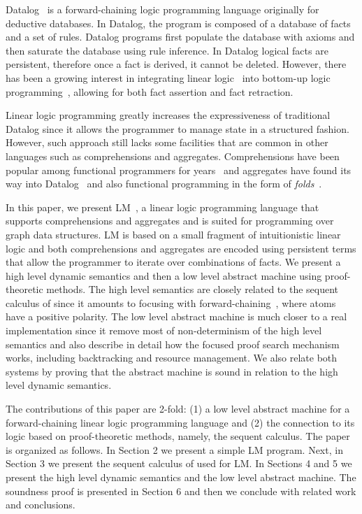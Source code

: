 
Datalog~\cite{Ramakrishnan93asurvey} is a forward-chaining logic programming
language originally for deductive databases. In Datalog, the program is composed
of a database of facts and a set of rules. Datalog programs first populate the
database with axioms and then saturate the database using rule inference. In
Datalog logical facts are persistent, therefore once a fact is derived, it
cannot be deleted. However, there has been a growing interest in integrating
linear logic~\cite{girard-87} into bottom-up logic
programming~\cite{Chang03ajudgmental,cruz-iclp14,Lopez:2005:MCL:1069774.1069778,simmons-lla},
allowing for both fact assertion and fact retraction.

Linear logic programming greatly increases the expressiveness of traditional
Datalog since it allows the programmer to manage state in a structured fashion.
However, such approach still lacks some facilities that are common in other
languages such as comprehensions and aggregates. Comprehensions have been
popular among functional programmers for years~\cite{npl1977} and aggregates
have found its way into
Datalog~\cite{Consens93lowcomplexity,Greco:1999:DPD:627321.627989} and also
functional programming in the form of
\emph{folds}~\cite{Hutton:1999:TUE:968578.968579}.

In this paper, we present LM~\cite{cruz-iclp14}, a linear logic programming
language that supports comprehensions and aggregates and is suited for
programming over graph data structures. LM is based on a small fragment of
intuitionistic linear logic and both comprehensions and aggregates are encoded
using persistent terms that allow the programmer to iterate over combinations of
facts. We present a high level dynamic semantics and then a low level abstract
machine using proof-theoretic methods. The high level semantics are closely
related to the sequent calculus of since it amounts to focusing with
forward-chaining~\cite{Andreoli92logicprogramming,laurent2004proof}, where atoms
have a positive polarity.  The low level abstract machine is much closer to a
real implementation since it remove most of non-determinism of the high level
semantics and also describe in detail how the focused proof search mechanism
works, including backtracking and resource management. We also relate both
systems by proving that the abstract machine is sound in relation to the high
level dynamic semantics.

The contributions of this paper are 2-fold: (1) a low level abstract machine for
a forward-chaining linear logic programming language and (2) the connection to
its logic based on proof-theoretic methods, namely, the sequent calculus.  The
paper is organized as follows. In Section 2 we present a simple LM program.
Next, in Section 3 we present the sequent calculus of used for LM. In Sections 4
and 5 we present the high level dynamic semantics and the low level abstract
machine. The soundness proof is presented in Section 6 and then we conclude with
related work and conclusions.
